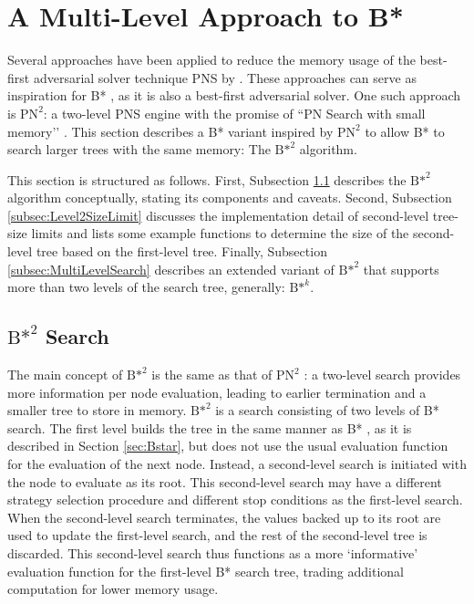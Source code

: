 \FloatBarrier
\newpage
\section{A Multi-Level Approach to B*}
\label{sec:BstarSquared}
Several approaches have been applied to reduce the memory usage of the best-first adversarial solver technique PNS by . These approaches can serve as inspiration for B* \cite{Berliner1979}, as it is also a best-first adversarial solver. One such approach is $\text{PN}^2$: a two-level PNS engine with the promise of ``PN Search with small memory’’ \cite{Breuker1998}. This section describes a B* variant inspired by $\text{PN}^2$ to allow B* to search larger trees with the same memory: The ${\text{B*}}^2$ algorithm.

This section is structured as follows. First, Subsection \ref{subsec:BstarSquaredAlgorithm} describes the ${\text{B*}}^2$ algorithm conceptually, stating its components and caveats. Second, Subsection \ref{subsec:Level2SizeLimit} discusses the implementation detail of second-level tree-size limits and lists some example functions to determine the size of the second-level tree based on the first-level tree. Finally, Subsection \ref{subsec:MultiLevelSearch} describes an extended variant of ${\text{B*}}^2$ that supports more than two levels of the search tree, generally: ${\text{B*}}^k$.

\subsection{\texorpdfstring{${\text{B*}}^2$}{B*²} Search}
\label{subsec:BstarSquaredAlgorithm}
The main concept of ${\text{B*}}^2$ is the same as that of $\text{PN}^2$ \cite{Breuker1998}: a two-level search provides more information per node evaluation, leading to earlier termination and a smaller tree to store in memory. ${\text{B*}}^2$ is a search consisting of two levels of B* search. The first level builds the tree in the same manner as B* \cite{Berliner1979}, as it is described in Section \ref{sec:Bstar}, but does not use the usual evaluation function for the evaluation of the next node. Instead, a second-level search is initiated with the node to evaluate as its root. This second-level search may have a different strategy selection procedure and different stop conditions as the first-level search. When the second-level search terminates, the values backed up to its root are used to update the first-level search, and the rest of the second-level tree is discarded. This second-level search thus functions as a more `informative’ evaluation function for the first-level B* search tree, trading additional computation for lower memory usage.

